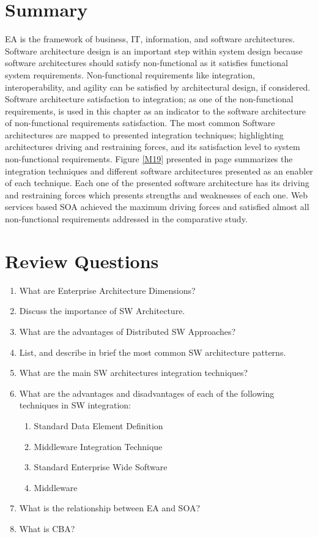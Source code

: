 \documentclass[12pt,a4paper,final,twoside,onecolumn,titlepage]{book}
\begin{document}
\section{Summary}
\gls{EA} is the framework of business, IT, information, and software architectures. Software architecture design is an important step within system design because software architectures should satisfy non-functional as it satisfies functional system requirements. Non-functional requirements like integration, interoperability, and agility can be satisfied by architectural design, if considered. Software architecture satisfaction to integration; as one of the non-functional requirements, is used in this chapter as an indicator to the software architecture of non-functional requirements satisfaction. 
The most common Software architectures are mapped to presented integration techniques; highlighting architectures driving and restraining forces, and its satisfaction level to system non-functional requirements. Figure \ref{M19} presented in page \pageref{M19} summarizes the integration techniques and different software architectures presented as an enabler of each technique. Each one of the presented software architecture has its driving and restraining forces which presents strengths and weaknesses of each one. Web services based \gls{SOA} achieved the maximum driving forces and satisfied almost all non-functional requirements addressed in the comparative study.

\section{Review Questions}
\begin{enumerate}
\item What are Enterprise Architecture Dimensions?
\item Discuss the importance of \gls{SW} Architecture.
\item What are the advantages of Distributed \gls{SW} Approaches?
\item List, and describe in brief the most common \gls{SW} architecture patterns.
\item What are the main SW architectures integration techniques?
\item What are the advantages and disadvantages of each of the following techniques in \gls{SW} integration:
\begin{enumerate}
\item Standard Data Element Definition
\item Middleware Integration Technique
\item Standard Enterprise Wide Software
\item Middleware
\end{enumerate}
\item What is the relationship between \gls{EA} and \gls{SOA}?
\item What is CBA?
\end{enumerate}
\end{document}
